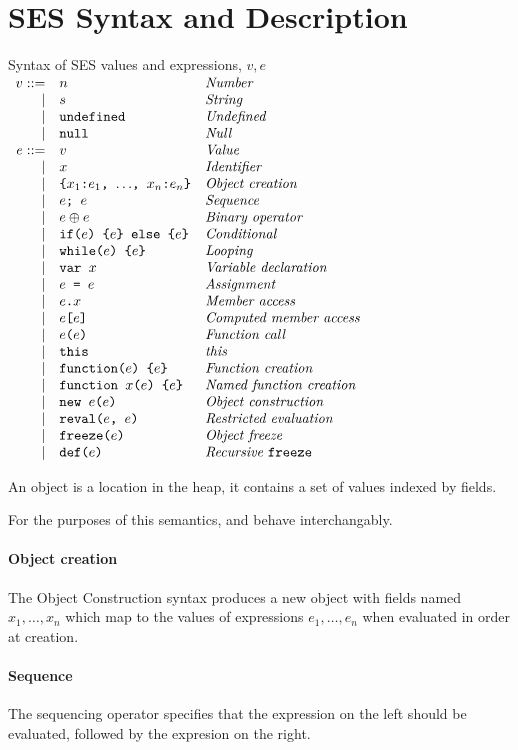 \documentclass[a4paper]{article}
\begin{document}
\section{SES Syntax and Description}

\newcommand{\syntaxline}[3][\pipe]{#1 & \js{#2} & \textit{#3}\\}
\begin{display}{Syntax of SES values and expressions, $v, e$}
  $\begin{array}{rll}
    \syntaxline[v ::=]{$n$}{Number}
    \syntaxline{$s$}{String}
    \syntaxline{undefined}{Undefined}
    \syntaxline{null}{Null}
    \syntaxline[e ::=]{$v$}{Value}
    \syntaxline{$x$}{Identifier}
    \syntaxline{\{$x_1$:$e_1$, $\ldots$, $x_n$:$e_n$\}}{Object creation}
    \syntaxline{$e$; $e$}{Sequence}
    \syntaxline{$e \oplus e$}{Binary operator}
    \syntaxline{if($e$) \{$e$\} else \{$e$\}}{Conditional}
    \syntaxline{while($e$) \{$e$\}}{Looping}
    \syntaxline{var $x$}{Variable declaration}
    \syntaxline{$e$ = $e$}{Assignment}
    \syntaxline{$e$.$x$}{Member access}
    \syntaxline{$e$[$e$]}{Computed member access}
    \syntaxline{$e$($e$)}{Function call}
    \syntaxline{this}{this}
    \syntaxline{function($e$) \{$e$\}}{Function creation}
    \syntaxline{function $x$($e$) \{$e$\}}{Named function creation}
    \syntaxline{new $e$($e$)}{Object construction}
    \syntaxline{reval($e$, $e$)}{Restricted evaluation}
    \syntaxline{freeze($e$)}{Object freeze}
    \syntaxline{def($e$)}{Recursive \js{freeze}}
  \end{array}$
\end{display}

An object is a location in the heap, it contains a set of
values indexed by fields.

For the purposes of this semantics,  and  behave
interchangably.

\paragraph{Object creation}  The Object Construction syntax produces a new object
with fields named $x_1, \ldots, x_n$ which map to the values of expressions
$e_1, \ldots, e_n$ when evaluated in order at creation.

\paragraph{Sequence} The sequencing operator specifies that the expression on the left should be
evaluated, followed by the expresion on the right.
\end{document}
